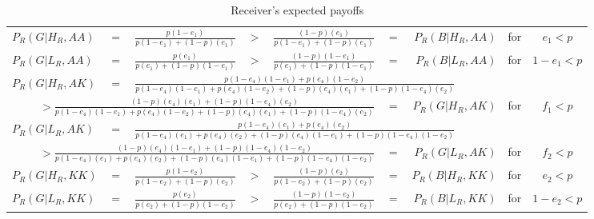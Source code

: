 \documentclass[a4paper,12pt]{article}
\numberwithin{equation}{section}
\begin{document}
\begin{table}[h]
\begin{center}
\setlength{\tabcolsep}{.22em}
\begin{tabular}{lcccccrcc}
$P_{R}(G|H_{R},AA)$ & $=$ & $\frac{p(1-e_{1})}{p(1-e_{1})+(1-p)(e_{1})}$ & $>$ & $\frac{(1-p)(e_{1})}{p(1-e_{1})+(1-p)(e_{1})}$ & $=$ & $P_{R}(B|H_{R},AA)$ & for & $e_{1}<p$\\
$P_{R}(G|L_{R},AA)$ & $=$ & $\frac{p(e_{1})}{p(e_{1})+(1-p)(1-e_{1})}$ & $>$ & $\frac{(1-p)(1-e_{1})}{p(e_{1})+(1-p)(1-e_{1})}$ & $=$ & $P_{R}(B|L_{R},AA)$ & for & $1-e_{1}<p$
\vspace{1mm}\\
$P_{R}(G|H_{R},AK)$ & $=$ & \multicolumn{7}{l}{$\frac{p(1-e_{4})(1-e_{1})+p(e_{4})(1-e_{2})}{p(1-e_{4})(1-e_{1})+p(e_{4})(1-e_{2})+(1-p)(e_{4})(e_{1})+(1-p)(1-e_{4})(e_{2})}$}
\vspace{1mm}\\
\multicolumn{5}{r}{$> \frac{(1-p)(e_{4})(e_{1})+(1-p)(1-e_{4})(e_{2})}{p(1-e_{4})(1-e_{1})+p(e_{4})(1-e_{2})+(1-p)(e_{4})(e_{1})+(1-p)(1-e_{4})(e_{2})}$} & $=$ & $P_{R}(G|H_{R},AK)$ & for & $f_{1}<p$
\vspace{2mm}\\
$P_{R}(G|L_{R},AK)$ & $=$ & \multicolumn{7}{l}{$\frac{p(1-e_{4})(e_{1})+p(e_{4})(e_{2})}{p(1-e_{4})(e_{1})+p(e_{4})(e_{2})+(1-p)(e_{4})(1-e_{1})+(1-p)(1-e_{4})(1-e_{2})}$}
\vspace{1mm}\\
\multicolumn{5}{r}{$> \frac{(1-p)(e_{4})(1-e_{1})+(1-p)(1-e_{4})(1-e_{2})}{p(1-e_{4})(e_{1})+p(e_{4})(e_{2})+(1-p)(e_{4})(1-e_{1})+(1-p)(1-e_{4})(1-e_{2})}$} & $=$ & $P_{R}(G|L_{R},AK)$ & for & $f_{2}<p$
\vspace{2mm}\\
$P_{R}(G|H_{R},KK)$ & $=$ & $\frac{p(1-e_{2})}{p(1-e_{2})+(1-p)(e_{2})}$ & $>$ & $\frac{(1-p)(e_{2})}{p(1-e_{2})+(1-p)(e_{2})}$ & $=$ & $P_{R}(B|H_{R},KK)$ & for & $e_{2}<p$\\
$P_{R}(G|L_{R},KK)$ & $=$ & $\frac{p(e_{2})}{p(e_{2})+(1-p)(1-e_{2})}$ & $>$ & $\frac{(1-p)(1-e_{2})}{p(e_{2})+(1-p)(1-e_{2})}$ & $=$ & $P_{R}(B|L_{R},KK)$ & for & $1-e_{2}<p$
\end{tabular}
\end{center}
\caption{Receiver's expected payoffs}
\label{tab:CueGamewithConditionalAmplification/ConditionalPayoffsR}
\end{table}
\end{document}
